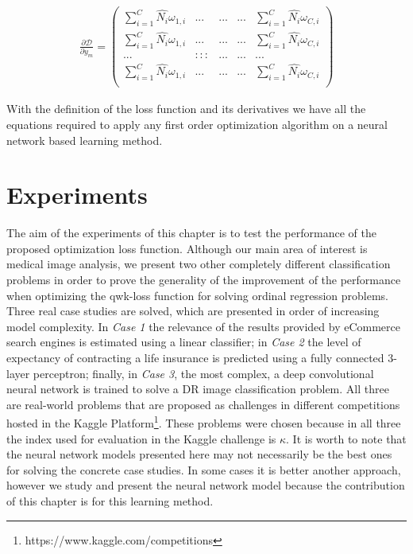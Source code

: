 \begin{equation}
\begin{aligned}
\frac{\partial \mathcal{D}}{\partial y_m} =
\begin{pmatrix} 
\sum_{i=1}^C \hat{N_i} \omega_{1,i} & ...  & ...     & ... & \sum_{i=1}^C \hat{N_i} \omega_{C,i}\\
\sum_{i=1}^C \hat{N_i} \omega_{1,i} & ...  & ...     & ... & \sum_{i=1}^C \hat{N_i} \omega_{C,i}\\
... & ::: & ... & ... & ...\\
\sum_{i=1}^C \hat{N_i} \omega_{1,i} & ...  & ...     & ... & \sum_{i=1}^C \hat{N_i} \omega_{C,i}\\ 
\end{pmatrix}
\end{aligned}
\end{equation}

With the definition of the loss function and its derivatives we have all the equations required to apply any first order optimization algorithm on a neural network based learning method. 

\section{Experiments}\label{loss:exp}

The aim of the experiments of this chapter is to test the performance of the proposed optimization loss function. Although our main area of interest is medical image analysis, we present two other completely different classification problems in order to prove the generality of the improvement of the performance when optimizing the qwk-loss function for solving ordinal regression problems. Three real case studies are solved, which are presented in order of increasing model complexity. In \emph{Case 1} the relevance of the results provided by eCommerce search engines is estimated using a linear classifier; in \emph{Case 2} the level of expectancy of contracting a life insurance is predicted using a fully connected 3-layer perceptron; finally, in \emph{Case 3}, the most complex, a deep convolutional neural network is trained to solve a DR image classification problem. All three are real-world problems that are proposed as challenges in different competitions hosted in the Kaggle Platform\footnote{https://www.kaggle.com/competitions}.
These problems were chosen because in all three the index used for evaluation in the Kaggle challenge is $\kappa$. It is worth to note that the neural network models presented here may not necessarily be the best ones for solving the concrete case studies. In some cases it is better another approach, however we study and present the neural network model because the contribution of this chapter is for this learning method.

